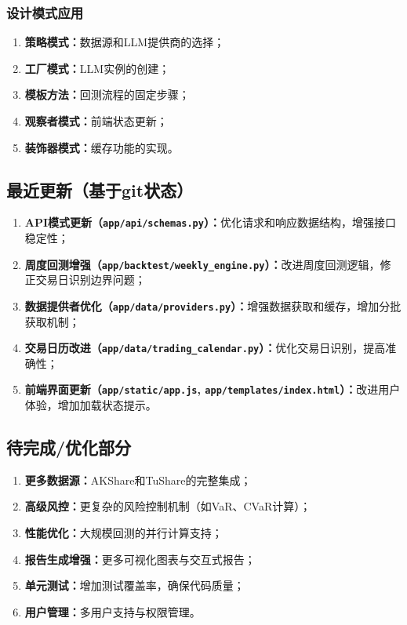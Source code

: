 \documentclass[12pt,a4paper]{ctexart}
\begin{document}
\subsubsection{设计模式应用}

\begin{enumerate}
    \item \textbf{策略模式：}数据源和LLM提供商的选择；
    \item \textbf{工厂模式：}LLM实例的创建；
    \item \textbf{模板方法：}回测流程的固定步骤；
    \item \textbf{观察者模式：}前端状态更新；
    \item \textbf{装饰器模式：}缓存功能的实现。
\end{enumerate}

\subsection{最近更新（基于git状态）}

\begin{enumerate}
    \item \textbf{API模式更新（\texttt{app/api/schemas.py}）：}优化请求和响应数据结构，增强接口稳定性；
    \item \textbf{周度回测增强（\texttt{app/backtest/weekly\_engine.py}）：}改进周度回测逻辑，修正交易日识别边界问题；
    \item \textbf{数据提供者优化（\texttt{app/data/providers.py}）：}增强数据获取和缓存，增加分批获取机制；
    \item \textbf{交易日历改进（\texttt{app/data/trading\_calendar.py}）：}优化交易日识别，提高准确性；
    \item \textbf{前端界面更新（\texttt{app/static/app.js}, \texttt{app/templates/index.html}）：}改进用户体验，增加加载状态提示。
\end{enumerate}

\subsection{待完成/优化部分}

\begin{enumerate}
    \item \textbf{更多数据源：}AKShare和TuShare的完整集成；
    \item \textbf{高级风控：}更复杂的风险控制机制（如VaR、CVaR计算）；
    \item \textbf{性能优化：}大规模回测的并行计算支持；
    \item \textbf{报告生成增强：}更多可视化图表与交互式报告；
    \item \textbf{单元测试：}增加测试覆盖率，确保代码质量；
    \item \textbf{用户管理：}多用户支持与权限管理。
\end{enumerate}
\end{document}
